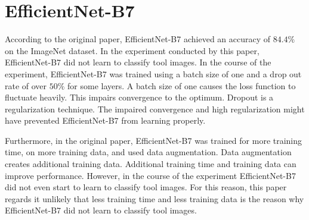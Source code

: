 \section{EfficientNet-B7}
\label{sec:disceffnet}
According to the original paper, EfficientNet-B7 achieved an accuracy of $84.4 \%$ on the ImageNet dataset. \autocite{Tan.2019} In the experiment conducted by this paper, EfficientNet-B7 did not learn to classify tool images. In the course of the experiment, EfficientNet-B7 was trained using a batch size of one and a drop out rate of over $50 \%$ for some layers. A batch size of one causes the loss function to fluctuate heavily. This impairs convergence to the optimum. Dropout is a regularization technique. The impaired convergence and high regularization might have prevented EfficientNet-B7 from learning properly.
\par
Furthermore, in the original paper, EfficientNet-B7 was trained for more training time, on more training data, and used data augmentation. \autocite{Tan.2019} Data augmentation creates additional training data. Additional training time and training data can improve performance. \autocite{ElAmir.2020} However, in the course of the experiment EfficientNet-B7 did not even start to learn to classify tool images. For this reason, this paper regards it unlikely that less training time and less training data is the reason why EfficientNet-B7 did not learn to classify tool images.



